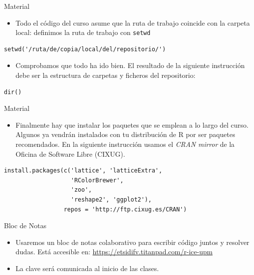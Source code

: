 \documentclass[xcolor={usenames,svgnames,dvipsnames}]{beamer}
\begin{document}
\begin{frame}[fragile,label=sec-1-1-4]{Material}
 \begin{itemize}
\item Todo el código del curso asume que la ruta de trabajo coincide con la carpeta local: definimos la ruta de trabajo con \texttt{setwd}
\end{itemize}
\lstset{language=R,label= ,caption= ,numbers=none}
\begin{lstlisting}
setwd('/ruta/de/copia/local/del/repositorio/')
\end{lstlisting}

\begin{itemize}
\item Comprobamos que todo ha ido bien. El resultado de la siguiente instrucción debe ser la estructura de carpetas y ficheros del repositorio:
\end{itemize}
\lstset{language=R,label= ,caption= ,numbers=none}
\begin{lstlisting}
dir()
\end{lstlisting}
\end{frame}

\begin{frame}[fragile,label=sec-1-1-5]{Material}
 \begin{itemize}
\item Finalmente hay que instalar los paquetes que se emplean a lo largo del curso. Algunos ya vendrán instalados con tu distribución de R por ser paquetes recomendados. En la siguiente instrucción usamos el \emph{CRAN mirror} de la Oficina de Software Libre (CIXUG).
\end{itemize}
\lstset{language=R,label= ,caption= ,numbers=none}
\begin{lstlisting}
install.packages(c('lattice', 'latticeExtra',
                   'RColorBrewer',
                   'zoo',
                   'reshape2', 'ggplot2'),
                 repos = 'http://ftp.cixug.es/CRAN')
\end{lstlisting}
\end{frame}

\begin{frame}[label=sec-1-1-6]{Bloc de Notas}
\begin{itemize}
\item Usaremos un bloc de notas colaborativo para escribir código juntos y resolver dudas. Está accesible en: \url{https://etsidifv.titanpad.com/r-ice-upm}

\item La clave será comunicada al inicio de las clases.
\end{itemize}
\end{frame}
\end{document}
